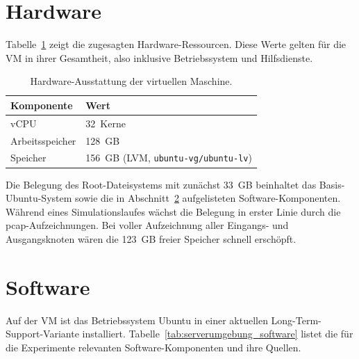 \section{Hardware}
\label{app:serverumgebung_hardware}

Tabelle~\ref{tab:serverumgebung_hardware} zeigt die zugesagten Hardware-Ressourcen.
Diese Werte gelten für die VM in ihrer Gesamtheit, also inklusive Betriebssystem und Hilfsdienste.

\begin{table}[H]
\centering
\caption{Hardware-Ausstattung der virtuellen Maschine.}
\label{tab:serverumgebung_hardware}
\begin{tabular}{ll}
\hline
Komponente & Wert \\
\hline
vCPU & 32~Kerne \\
Arbeitsspeicher & 128~GB \\
Speicher & 156~GB (LVM, \texttt{ubuntu-vg/ubuntu-lv}) \\
\hline
\end{tabular}
\end{table}

Die Belegung des Root-Dateisystems mit zunächst 33~GB beinhaltet das Basis-Ubuntu-System sowie die in Abschnitt~\ref{app:serverumgebung_software} aufgelisteten Software-Komponenten.
Während eines Simulationslaufes wächst die Belegung in erster Linie durch die \gls{pcap}-Aufzeichnungen.
Bei voller Aufzeichnung aller Eingangs- und Ausgangsknoten wären die 123~GB freier Speicher schnell erschöpft.

\section{Software}
\label{app:serverumgebung_software}

Auf der VM ist das Betriebssystem Ubuntu in einer aktuellen Long-Term-Support-Variante installiert.
Tabelle~\ref{tab:serverumgebung_software} listet die für die Experimente relevanten Software-Komponenten und ihre Quellen.

